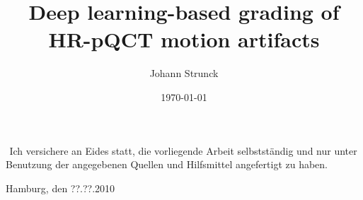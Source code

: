 \documentclass[
a4paper, 
12pt,
grayscalebody, %
abstract=on,
twoside, BCOR10mm, 12pt, DIV13,headinclude, footexclude, final, abstracton, openright
]{ibireprt}
\author{Johann Strunck}
\title{Deep learning-based grading of HR-pQCT motion artifacts}
\date{\today}
\numberwithin{equation}{chapter}
\numberwithin{table}{chapter}
\numberwithin{figure}{chapter}
\numberwithin{algorithm}{chapter}
\numberwithin{example}{chapter}
\numberwithin{example}{chapter}
\begin{document}
\maketitle


\newpage
${}^{}$
\vfill
\noindent
Ich versichere an Eides statt, die vorliegende Arbeit selbstständig und nur unter Benutzung der angegebenen Quellen und Hilfsmittel angefertigt zu haben.\\
\vspace{1.5cm}

\noindent
Hamburg, den ??.??.2010
\thispagestyle{empty}
\newpage
\newpage

\setlength{\parskip}{1.5mm }





\tableofcontents
\end{document}

